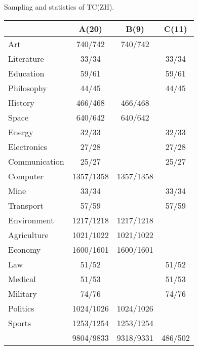 \centering
\caption{Sampling and statistics of TC(ZH).}
\begin{tabular}{|l|c|c|c|}
\hline
              & A(20)     & B(9)      & C(11)   \\ \hline
Art           & 740/742   & 740/742   &         \\ \hline
Literature    & 33/34     &           & 33/34   \\ \hline
Education     & 59/61     &           & 59/61   \\ \hline
Philosophy    & 44/45     &           & 44/45   \\ \hline
History       & 466/468   & 466/468   &         \\ \hline
Space         & 640/642   & 640/642   &         \\ \hline
Energy        & 32/33     &           & 32/33   \\ \hline
Electronics   & 27/28     &           & 27/28   \\ \hline
Communication & 25/27     &           & 25/27   \\ \hline
Computer      & 1357/1358 & 1357/1358 &         \\ \hline
Mine          & 33/34     &           & 33/34   \\ \hline
Transport     & 57/59     &           & 57/59   \\ \hline
Environment   & 1217/1218 & 1217/1218 &         \\ \hline
Agriculture   & 1021/1022 & 1021/1022 &         \\ \hline
Economy       & 1600/1601 & 1600/1601 &         \\ \hline
Law           & 51/52     &           & 51/52   \\ \hline
Medical       & 51/53     &           & 51/53   \\ \hline
Military      & 74/76     &           & 74/76   \\ \hline
Politics      & 1024/1026 & 1024/1026 &         \\ \hline
Sports        & 1253/1254 & 1253/1254 &         \\ \hline
              & 9804/9833 & 9318/9331 & 486/502 \\ \hline
\end{tabular}
